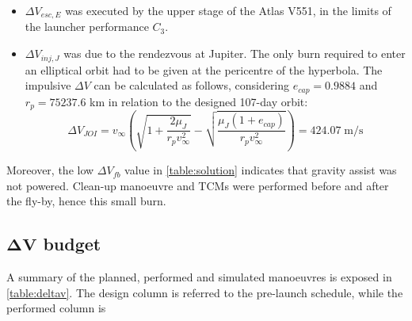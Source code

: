 \begin{itemize}
    \item $\Delta V_{esc,E}$ was executed by the upper stage of the Atlas V551, in the limits of the launcher performance $C_3$.
    \item $\Delta V_{inj,J}$ was due to the rendezvous at Jupiter. The only burn required to enter an elliptical orbit had to be given at the pericentre of the hyperbola. The impulsive $\Delta V$ can be calculated as follows, considering $e_{cap} = 0.9884$ and $r_p = 75237.6$ km in relation to the designed 107-day orbit: 
    \begin{equation}
        \Delta V_{JOI} = v_{\infty} \left( \sqrt{1 + \frac{2\mu_{J}}{r_p v_{\infty}^2}} - \sqrt{\frac{\mu_{J} (1 + e_{cap})}{r_p v_{\infty}^2}}\right) =  424.07 \; \textrm{m/s}
    \end{equation}
\end{itemize}
Moreover, the low $\Delta V_{fb}$ value in \autoref{table:solution} indicates that gravity assist was not powered. Clean-up manoeuvre and TCMs were performed before and after the fly-by, hence this small burn.

\subsection
[\texorpdfstring{$\Delta V$}{Delta-V} budget]
{\texorpdfstring{$\boldsymbol{\Delta V}$}{Delta-V} budget}
\label{subsec:deltav_budget}

A summary of the planned, performed and simulated manoeuvres is exposed in \autoref{table:deltav}. The design column is referred to the pre-launch schedule, while the performed column is 

